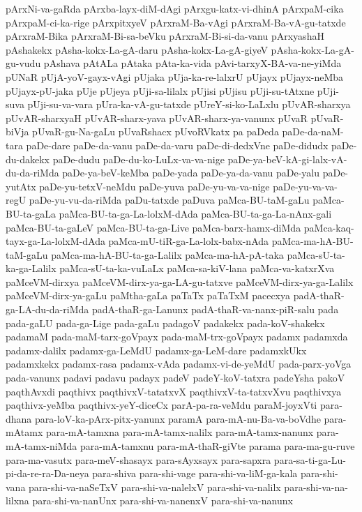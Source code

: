{pArxNi-va-gaRda
pArxba-layx-diM-dAgi
pArxgu-katx-vi-dhinA
pArxpaM-cika
pArxpaM-ci-ka-rige
pArxpitxyeV
pArxraM-Ba-vAgi
pArxraM-Ba-vA-gu-tatxde
pArxraM-Bika
pArxraM-Bi-sa-beVku
pArxraM-Bi-si-da-vanu
pArxyashaH
pAshakekx
pAsha-kokx-La-gA-daru
pAsha-kokx-La-gA-giyeV
pAsha-kokx-La-gA-gu-vudu
pAshava
pAtALa
pAtaka
pAta-ka-vida
pAvi-tarxyX-BA-va-ne-yiMda
pUNaR
pUjA-yoV-gayx-vAgi
pUjaka
pUja-ka-re-lalxrU
pUjayx
pUjayx-neMba
pUjayx-pU-jaka
pUje
pUjeya
pUji-sa-lilalx
pUjisi
pUjisu
pUji-su-tAtxne
pUji-suva
pUji-su-va-vara
pUra-ka-vA-gu-tatxde
pUreY-si-ko-LaLxlu
pUvAR-sharxya
pUvAR-sharxyaH
pUvAR-sharx-yava
pUvAR-sharx-ya-vanunx
pUvaR
pUvaR-biVja
pUvaR-gu-Na-gaLu
pUvaRshacx
pUvoRVkatx
pa
paDeda
paDe-da-naM-tara
paDe-dare
paDe-da-vanu
paDe-da-varu
paDe-di-dedxVne
paDe-didudx
paDe-du-dakekx
paDe-dudu
paDe-du-ko-LuLx-va-va-nige
paDe-ya-beV-kA-gi-lalx-vA-du-da-riMda
paDe-ya-beV-keMba
paDe-yada
paDe-ya-da-vanu
paDe-yalu
paDe-yutAtx
paDe-yu-tetxV-neMdu
paDe-yuva
paDe-yu-va-va-nige
paDe-yu-va-va-regU
paDe-yu-vu-da-riMda
paDu-tatxde
paDuva
paMca-BU-taM-gaLu
paMca-BU-ta-gaLa
paMca-BU-ta-ga-La-lolxM-dAda
paMca-BU-ta-ga-La-nAnx-gali
paMca-BU-ta-gaLeV
paMca-BU-ta-ga-Live
paMca-barx-hamx-diMda
paMca-kaq-tayx-ga-La-lolxM-dAda
paMca-mU-tiR-ga-La-lolx-babx-nAda
paMca-ma-hA-BU-taM-gaLu
paMca-ma-hA-BU-ta-ga-Lalilx
paMca-ma-hA-pA-taka
paMca-sU-ta-ka-ga-Lalilx
paMca-sU-ta-ka-vuLaLx
paMca-sa-kiV-lana
paMca-va-katxrXva
paMceVM-dirxya
paMceVM-dirx-ya-ga-LA-gu-tatxve
paMceVM-dirx-ya-ga-Lalilx
paMceVM-dirx-ya-gaLu
paMtha-gaLa
paTaTx
paTaTxM
pacecxya
padA-thaR-ga-LA-du-da-riMda
padA-thaR-ga-Lanunx
padA-thaR-va-nanx-piR-salu
pada
pada-gaLU
pada-ga-Lige
pada-gaLu
padagoV
padakekx
pada-koV-shakekx
padamaM
pada-maM-tarx-goVpayx
pada-maM-trx-goVpayx
padamx
padamxda
padamx-dalilx
padamx-ga-LeMdU
padamx-ga-LeM-dare
padamxkUkx
padamxkekx
padamx-rasa
padamx-vAda
padamx-vi-de-yeMdU
pada-parx-yoVga
pada-vanunx
padavi
padavu
padayx
padeV
padeY-koV-tatxra
padeYsha
pakoV
paqthAvxdi
paqthivx
paqthivxV-tatatxvX
paqthivxV-ta-tatxvXvu
paqthivxya
paqthivx-yeMba
paqthivx-yeY-diceCx
parA-pa-ra-veMdu
paraM-joyxVti
para-dhana
para-loV-ka-pArx-pitx-yanunx
paramA
para-mA-nu-Ba-va-boVdhe
para-mAtamx
para-mA-tamxna
para-mA-tamx-nalilx
para-mA-tamx-nanunx
para-mA-tamx-niMda
para-mA-tamxnu
para-mA-thaR-giVte
parama
para-ma-gu-ruve
para-ma-vasutx
para-meV-shasayx
para-sAyxsayx
para-sapxra
para-sa-ti-ga-Lu-pi-da-re-ra-Da-neya
para-shiva
para-shi-vage
para-shi-va-liM-ga-kala
para-shi-vana
para-shi-va-naSeTxV
para-shi-va-nalelxV
para-shi-va-nalilx
para-shi-va-na-lilxna
para-shi-va-nanUnx
para-shi-va-nanenxV
para-shi-va-nanunx
}
